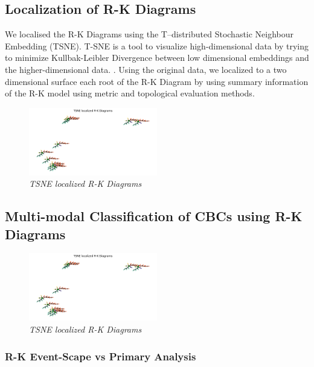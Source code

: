 \subsection{Localization of R-K Diagrams}

We localised the R-K Diagrams using the T--distributed Stochastic Neighbour Embedding (TSNE). T-SNE is a tool to visualize high-dimensional data by trying to minimize Kullbak-Leibler Divergence between low dimensional embeddings and the higher-dimensional data. \cite{sklearn.manifold.tsne_2014}. Using the original data, we localized to a two dimensional surface each root of the R-K Diagram by using summary information of the R-K model using metric and topological evaluation methods.

\begin{figure}[H]
	\centering
        \includegraphics[width=0.5\textwidth]{images/TSNELocalizedRKDiagrams.png}
	\caption{\textit{TSNE localized R-K Diagrams}}
	\label{fig:tsne}
\end{figure}

\subsection{Multi-modal Classification of CBCs using R-K Diagrams}


\begin{figure}[H]
	\centering
	\includegraphics[width=0.5\textwidth]{images/TSNELocalizedRKDiagrams.png}
	\caption{\textit{TSNE localized R-K Diagrams}}
	\label{fig:tsne2}
\end{figure}

\subsubsection{R-K Event-Scape vs Primary Analysis}
 
